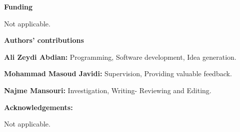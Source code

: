 \documentclass[10pt,twocolumn]{article}
\begin{document}
\begin{flushleft}
{\bf Funding}
\end{flushleft}

Not applicable.

\begin{flushleft}
{\bf Authors' contributions}
\end{flushleft}

{\bf Ali Zeydi Abdian:} Programming, Software development,  Idea generation.\vspace{2mm}

{\bf Mohammad Masoud Javidi:} Supervision, Providing valuable feedback.\vspace{2mm}


{\bf Najme Mansouri:} Investigation, Writing- Reviewing and Editing.\\



\begin{flushleft}
{\bf Acknowledgements:}
\end{flushleft}

Not applicable.





%
%
%
%
%
%
%
\end{document}
